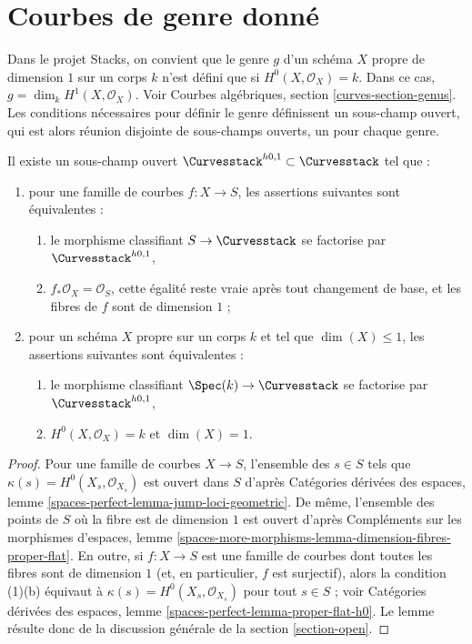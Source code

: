 \section{Courbes de genre donné}
\label{section-genus}

\noindent
Dans le projet Stacks, on convient que le genre $g$ d'un
schéma $X$ propre de dimension $1$ sur un corps $k$ n'est défini que
si $H^0(X, \mathcal{O}_X) = k$. Dans ce cas,
$g = \dim_k H^1(X, \mathcal{O}_X)$.
Voir Courbes algébriques, section \ref{curves-section-genus}.
Les conditions nécessaires pour définir le genre définissent un sous-champ ouvert,
qui est alors réunion disjointe de sous-champs ouverts, un pour chaque genre.

\begin{lemma}
\label{lemma-pre-genus-curves}
Il existe un sous-champ ouvert $\Curvesstack^{h0, 1} \subset \Curvesstack$
tel que :
\begin{enumerate}
\item pour une famille de courbes $f : X \to S$, les assertions suivantes
sont équivalentes :
\begin{enumerate}
\item le morphisme classifiant $S \to \Curvesstack$ se factorise par
$\Curvesstack^{h0, 1}$,
\item $f_*\mathcal{O}_X = \mathcal{O}_S$, cette égalité reste vraie
après tout changement de base, et les fibres de $f$ sont de dimension $1$ ;
\end{enumerate}
\item pour un schéma $X$ propre sur un corps $k$ et tel que $\dim(X) \leq 1$,
les assertions suivantes sont équivalentes :
\begin{enumerate}
\item le morphisme classifiant $\Spec(k) \to \Curvesstack$ se factorise par
$\Curvesstack^{h0, 1}$,
\item $H^0(X, \mathcal{O}_X) = k$ et $\dim(X) = 1$.
\end{enumerate}
\end{enumerate}
\end{lemma}

\begin{proof}
Pour une famille de courbes $X \to S$, l'ensemble des $s \in S$ tels que
$\kappa(s) = H^0(X_s, \mathcal{O}_{X_s})$
est ouvert dans $S$ d'après Catégories dérivées des espaces, lemme
\ref{spaces-perfect-lemma-jump-loci-geometric}.
De même, l'ensemble des points de $S$ où la fibre est de
dimension $1$ est ouvert d'après Compléments sur les morphismes d'espaces, lemme
\ref{spaces-more-morphisms-lemma-dimension-fibres-proper-flat}.
En outre, si $f : X \to S$ est une famille de courbes dont toutes les fibres
sont de dimension $1$ (et, en particulier, $f$ est surjectif), alors
la condition (1)(b) équivaut à
$\kappa(s) = H^0(X_s, \mathcal{O}_{X_s})$ pour tout $s \in S$ ; voir
Catégories dérivées des espaces, lemme \ref{spaces-perfect-lemma-proper-flat-h0}.
Le lemme résulte donc de la discussion générale de la
section \ref{section-open}.
\end{proof}

